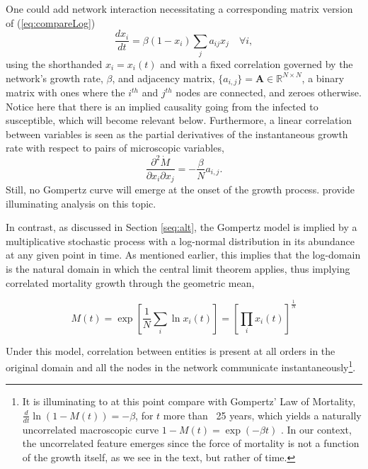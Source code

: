 \documentclass{article}
\begin{document}
One could add network interaction necessitating a corresponding matrix version of (\ref{eq:compareLog})
\begin{equation}
\label{eq:networkSIR}
\frac{d x_i}{dt} = \beta (1-x_i)\sum_j{a_{ij}}x_j \quad \forall i,
\end{equation}
using the shorthanded $x_i=x_i(t)$ and with a fixed correlation governed by the network's growth rate, $\beta$, and adjacency matrix, $\{a_{i,j}\}=\mathbf{A} \in \mathbb{R}^{N \times N}$, a binary matrix with ones where the $i^{th}$ and $j^{th}$ nodes are connected, and zeroes otherwise. Notice here that there is an implied causality going from the infected to susceptible, which will become relevant below. Furthermore, a linear correlation between variables is seen as the partial derivatives of the instantaneous growth rate with respect to pairs of microscopic variables,
\begin{equation}
\frac{\partial^2 \dot{M}}{\partial x_i \partial x_j} = -\frac{\beta}{N} a_{i,j}.
\end{equation}
Still, no Gompertz curve will emerge at the onset of the growth process. \citet{estrada2022networked} provide illuminating analysis on this topic.

In contrast, as discussed in Section \ref{seq:alt}, the Gompertz model is implied by a multiplicative stochastic process with a log-normal distribution in its abundance at any given point in time. As mentioned earlier, this implies that the log-domain is the natural domain in which the central limit theorem applies, thus implying correlated mortality growth through the geometric mean,

\begin{equation}
M(t) = \exp \left[\frac{1}{N}\sum_i \ln x_i(t)\right] = \left[\prod_i x_i (t)\right]^{\frac{1}{N}}
\end{equation} 

Under this model, correlation between entities is present at all orders in the original domain and all the nodes in the network communicate instantaneously\footnote{It is illuminating to at this point compare with Gompertz' Law of Mortality, $\frac{d}{dt}\ln{(1 - M(t))} = -\beta$, for $t$ more than ~25 years, which yields a naturally uncorrelated macroscopic curve $1 - M(t) = \exp{(-\beta t)}$ \citep{shklovskii2005simple}. 
In our context, the uncorrelated feature emerges since the force of mortality is not a function of the growth itself, as we see in the text, but rather of time.}.
\end{document}
